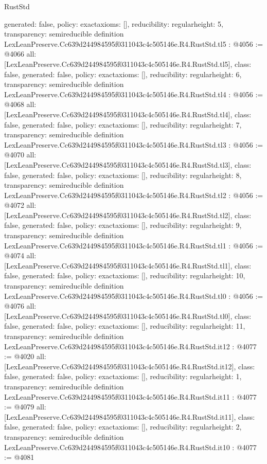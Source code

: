 \begin{lexlean}{RustStd}
\begin{coremodule}
{  generated: false,
  policy: exact{axioms: []},
  reducibility: regular{height: 5},
  transparency: semireducible
}
definition LexLeanPreserve.Cc639d244984595f0311043c4c505146e.R4.RustStd.tl5 : @4056 := @4066 {
  all: [LexLeanPreserve.Cc639d244984595f0311043c4c505146e.R4.RustStd.tl5],
  class: false,
  generated: false,
  policy: exact{axioms: []},
  reducibility: regular{height: 6},
  transparency: semireducible
}
definition LexLeanPreserve.Cc639d244984595f0311043c4c505146e.R4.RustStd.tl4 : @4056 := @4068 {
  all: [LexLeanPreserve.Cc639d244984595f0311043c4c505146e.R4.RustStd.tl4],
  class: false,
  generated: false,
  policy: exact{axioms: []},
  reducibility: regular{height: 7},
  transparency: semireducible
}
definition LexLeanPreserve.Cc639d244984595f0311043c4c505146e.R4.RustStd.tl3 : @4056 := @4070 {
  all: [LexLeanPreserve.Cc639d244984595f0311043c4c505146e.R4.RustStd.tl3],
  class: false,
  generated: false,
  policy: exact{axioms: []},
  reducibility: regular{height: 8},
  transparency: semireducible
}
definition LexLeanPreserve.Cc639d244984595f0311043c4c505146e.R4.RustStd.tl2 : @4056 := @4072 {
  all: [LexLeanPreserve.Cc639d244984595f0311043c4c505146e.R4.RustStd.tl2],
  class: false,
  generated: false,
  policy: exact{axioms: []},
  reducibility: regular{height: 9},
  transparency: semireducible
}
definition LexLeanPreserve.Cc639d244984595f0311043c4c505146e.R4.RustStd.tl1 : @4056 := @4074 {
  all: [LexLeanPreserve.Cc639d244984595f0311043c4c505146e.R4.RustStd.tl1],
  class: false,
  generated: false,
  policy: exact{axioms: []},
  reducibility: regular{height: 10},
  transparency: semireducible
}
definition LexLeanPreserve.Cc639d244984595f0311043c4c505146e.R4.RustStd.tl0 : @4056 := @4076 {
  all: [LexLeanPreserve.Cc639d244984595f0311043c4c505146e.R4.RustStd.tl0],
  class: false,
  generated: false,
  policy: exact{axioms: []},
  reducibility: regular{height: 11},
  transparency: semireducible
}
definition LexLeanPreserve.Cc639d244984595f0311043c4c505146e.R4.RustStd.it12 : @4077 := @4020 {
  all: [LexLeanPreserve.Cc639d244984595f0311043c4c505146e.R4.RustStd.it12],
  class: false,
  generated: false,
  policy: exact{axioms: []},
  reducibility: regular{height: 1},
  transparency: semireducible
}
definition LexLeanPreserve.Cc639d244984595f0311043c4c505146e.R4.RustStd.it11 : @4077 := @4079 {
  all: [LexLeanPreserve.Cc639d244984595f0311043c4c505146e.R4.RustStd.it11],
  class: false,
  generated: false,
  policy: exact{axioms: []},
  reducibility: regular{height: 2},
  transparency: semireducible
}
definition LexLeanPreserve.Cc639d244984595f0311043c4c505146e.R4.RustStd.it10 : @4077 := @4081 {
}
\end{coremodule}
\end{lexlean}
